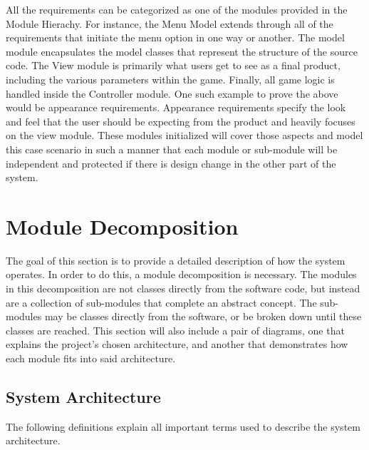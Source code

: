 \documentclass{article}
\begin{document}
All the requirements can be categorized as one of the modules provided in the Module Hierachy. For instance, the Menu Model extends through all of the requirements that initiate the menu option in one way or another. The model module encapsulates the model classes that represent the structure of the source code. The View module is primarily what users get to see as a final product, including the various parameters within the game. Finally, all game logic is handled inside the Controller module. One such example to prove the above would be appearance requirements. Appearance requirements specify the look and feel that the user should be expecting from the product and heavily focuses on the view module. These modules initialized will cover those aspects and model this case scenario in such a manner that each module or sub-module will be independent and protected if there is design change in the other part of the system.


\section{Module Decomposition} \label{SecMD}

The goal of this section is to provide a detailed description of how the system operates. In order to do this, a module decomposition is necessary. The modules in this decomposition are not classes directly from the software code, but instead are a collection of sub-modules that complete an abstract concept. The sub-modules may be classes directly from the software, or be broken down until these classes are reached. This section will also include a pair of diagrams, one that explains the project's chosen architecture, and another that demonstrates how each module fits into said architecture. 

\subsection{System Architecture}

The following definitions explain all important terms used to describe the system architecture.
\end{document}
